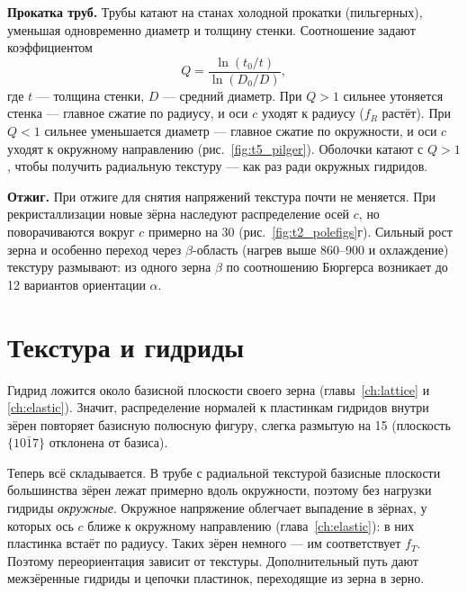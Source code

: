\textbf{Прокатка труб.} Трубы катают на станах холодной прокатки (пильгерных), уменьшая одновременно диаметр и толщину
стенки. Соотношение задают коэффициентом
\begin{equation}
Q = \frac{\ln(t_0/t)}{\ln(D_0/D)},
\end{equation}
где $t$ --- толщина стенки, $D$ --- средний диаметр. При $Q > 1$ сильнее утоняется стенка --- главное сжатие по радиусу,
и оси $c$ уходят к радиусу ($f_R$ растёт). При $Q < 1$ сильнее уменьшается диаметр --- главное сжатие по окружности,
и оси $c$ уходят к окружному направлению (рис.~\ref{fig:t5_pilger}). Оболочки катают с $Q > 1$, чтобы получить
радиальную текстуру --- как раз ради окружных гидридов.


\textbf{Отжиг.} При отжиге для снятия напряжений текстура почти не меняется. При рекристаллизации новые зёрна
наследуют распределение осей $c$, но поворачиваются вокруг $c$ примерно на 30\textdegree{} (рис.~\ref{fig:t2_polefigs}г).
Сильный рост зерна и особенно переход через $\beta$-область (нагрев выше 860--900\degC{} и охлаждение) текстуру
размывают: из одного зерна $\beta$ по соотношению Бюргерса возникает до 12 вариантов ориентации $\alpha$.

\section{Текстура и гидриды}

Гидрид ложится около базисной плоскости своего зерна (главы~\ref{ch:lattice} и \ref{ch:elastic}). Значит,
распределение нормалей к пластинкам гидридов внутри зёрен повторяет базисную полюсную фигуру, слегка размытую на
15\textdegree{} (плоскость $\{10\bar17\}$ отклонена от базиса).

\begin{zrbox}
Теперь всё складывается. В трубе с радиальной текстурой базисные плоскости большинства зёрен лежат примерно вдоль
окружности, поэтому без нагрузки гидриды \emph{окружные}. Окружное напряжение облегчает выпадение в зёрнах, у
которых ось $c$ ближе к окружному направлению (глава~\ref{ch:elastic}): в них пластинка встаёт по радиусу. Таких
зёрен немного --- им соответствует $f_T$. Поэтому переориентация зависит от текстуры. Дополнительный путь дают
межзёренные гидриды и цепочки пластинок, переходящие из зерна в зерно.
\end{zrbox}

